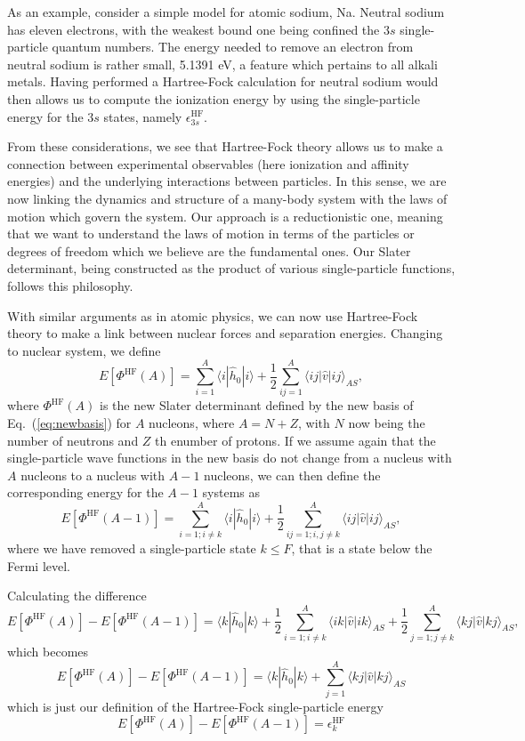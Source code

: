 \documentclass[%
oneside,                 %
final,                   %
10pt]{article}
\begin{document}
As an example, consider a simple model for atomic sodium, Na. Neutral sodium has eleven electrons, 
with the weakest bound one being confined the $3s$ single-particle quantum numbers. The energy needed to remove an electron from neutral sodium is rather small, 5.1391 eV, a feature which pertains to all alkali metals.
Having performed a  Hartree-Fock calculation for neutral sodium would then allows us to compute the
ionization energy by using the single-particle energy for the $3s$ states, namely $\epsilon_{3s}^{\mathrm{HF}}$. 

From these considerations, we see that Hartree-Fock theory allows us to make a connection between experimental 
observables (here ionization and affinity energies) and the underlying interactions between particles.  
In this sense, we are now linking the dynamics and structure of a many-body system with the laws of motion which govern the system. Our approach is a reductionistic one, meaning that we want to understand the laws of motion 
in terms of the particles or degrees of freedom which we believe are the fundamental ones. Our Slater determinant, being constructed as the product of various single-particle functions, follows this philosophy.

With similar arguments as in atomic physics, we can now use Hartree-Fock theory to make a link
between nuclear forces and separation energies. Changing to nuclear system, we define
\[
  E[\Phi^{\mathrm{HF}}(A)] 
  = \sum_{i=1}^A \langle i | \hat{h}_0 | i \rangle +
  \frac{1}{2}\sum_{ij=1}^A\langle ij|\hat{v}|ij\rangle_{AS},
\]
where $\Phi^{\mathrm{HF}}(A)$ is the new Slater determinant defined by the new basis of Eq.~(\ref{eq:newbasis})
for $A$ nucleons, where $A=N+Z$, with $N$ now being the number of neutrons and $Z$ th enumber of protons.  If we assume again that the single-particle wave functions in the new basis do not change from a nucleus with $A$ nucleons to a nucleus with $A-1$  nucleons, we can then define the corresponding energy for the $A-1$ systems as 
\[
  E[\Phi^{\mathrm{HF}}(A-1)] 
  = \sum_{i=1; i\ne k}^A \langle i | \hat{h}_0 | i \rangle +
  \frac{1}{2}\sum_{ij=1;i,j\ne k}^A\langle ij|\hat{v}|ij\rangle_{AS},
\]
where we have removed a single-particle state $k\le F$, that is a state below the Fermi level.  

Calculating the difference 
\[
  E[\Phi^{\mathrm{HF}}(A)]-   E[\Phi^{\mathrm{HF}}(A-1)] 
  = \langle k | \hat{h}_0 | k \rangle +
  \frac{1}{2}\sum_{i=1;i\ne k}^A\langle ik|\hat{v}|ik\rangle_{AS} + \frac{1}{2}\sum_{j=1;j\ne k}^A\langle kj|\hat{v}|kj\rangle_{AS},
\]
which becomes 
\[
  E[\Phi^{\mathrm{HF}}(A)]-   E[\Phi^{\mathrm{HF}}(A-1)] 
  = \langle k | \hat{h}_0 | k \rangle +\sum_{j=1}^A\langle kj|\hat{v}|kj\rangle_{AS}
\]
which is just our definition of the Hartree-Fock single-particle energy
\[
  E[\Phi^{\mathrm{HF}}(A)]-   E[\Phi^{\mathrm{HF}}(A-1)] 
  = \epsilon_k^{\mathrm{HF}} 
\]
\end{document}
